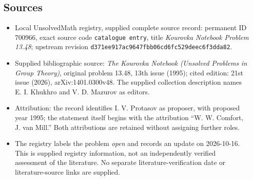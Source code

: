 \documentclass[11pt]{article}
\begin{document}
\subsection{Sources}
\begin{itemize}
\item Local UnsolvedMath registry, supplied complete source record: permanent ID \(700966\), exact source code \texttt{catalogue entry}, title \emph{Kourovka Notebook Problem 13.48}; upstream revision \texttt{d371ee917ac9647fbb06cd6fc529deec6f3dda82}.
\item Supplied bibliographic source: \emph{The Kourovka Notebook (Unsolved Problems in Group Theory)}, original problem 13.48, 13th issue (1995); cited edition: 21st issue (2026), arXiv:1401.0300v48. The supplied collection description names E. I. Khukhro and V. D. Mazurov as editors.
\item Attribution: the record identifies I. V. Protasov as proposer, with proposed year 1995; the statement itself begins with the attribution ``W. W. Comfort, J. van Mill.'' Both attributions are retained without assigning further roles.
\item The registry labels the problem \emph{open} and records an update on 2026-10-16. This is supplied registry information, not an independently verified assessment of the literature. No separate literature-verification date or literature-source links are supplied.
\end{itemize}
\end{document}
